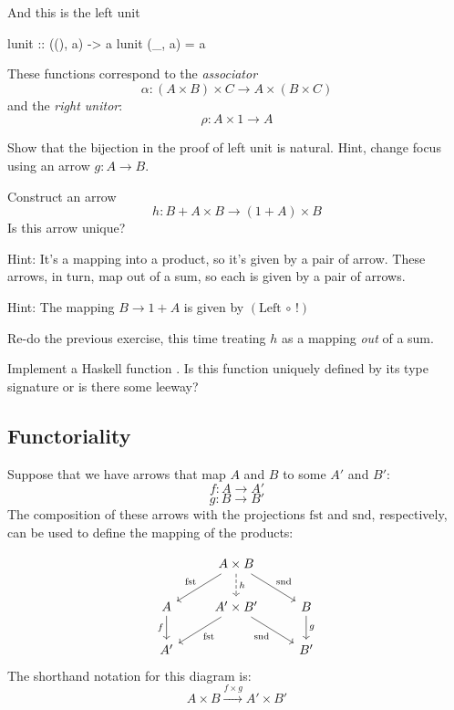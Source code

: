 \documentclass[DaoFP]{subfiles}
\begin{document}
And this is the left unit
\begin{haskell}
lunit :: ((), a) -> a
lunit (_, a) = a
\end{haskell}

These functions correspond to the \emph{associator}
\[ \alpha \colon (A \times B) \times C \to A \times (B \times C) \]
and the \emph{right unitor}:
\[ \rho \colon A \times 1 \to A \]

\begin{exercise}
Show that the bijection in the proof of left unit is natural. Hint, change focus using an arrow $g \colon A \to B$.
\end{exercise}

\begin{exercise}
Construct an arrow 
\[ h \colon B + A \times B \to (1 + A) \times B \]
Is this arrow unique?

Hint: It's a mapping into a product, so it's given by a pair of arrow. These arrows, in turn, map out of a sum, so each is given by a pair of arrows. 

Hint: The mapping $B \to 1 + A$ is given by $(\text{Left} \, \circ \, !)$
\end{exercise}

\begin{exercise}
Re-do the previous exercise, this time treating $h$ as a mapping \emph{out} of a sum. 
\end{exercise}

\begin{exercise}
Implement a Haskell function . Is this function uniquely defined by its type signature or is there some leeway?
\end{exercise}

\subsection{Functoriality}

Suppose that we have arrows that map $A$ and $B$ to some $A'$ and $B'$:
\[f \colon A \to A' \]
\[g \colon B \to B'\]
The composition of these arrows with the projections $\text{fst}$ and $\text{snd}$, respectively, can be used to define the mapping of the products:

\[
 \begin{tikzcd}
 & A \times B
\arrow[d, dashed, "h"]
 \arrow[dl,  "\text{fst}"']
 \arrow[dr,   "\text{snd}"]
\\
A
\arrow[d, "f"']
&A' \times B'
 \arrow[dl,  "\text{fst}"]
  \arrow[dr,   "\text{snd}"']
& B
\arrow[d, "g"]
\\
A' && B'
 \end{tikzcd}
\]
The shorthand notation for this diagram is:
\[ A \times B \xrightarrow{f \times g} A' \times B' \]
\end{document}
